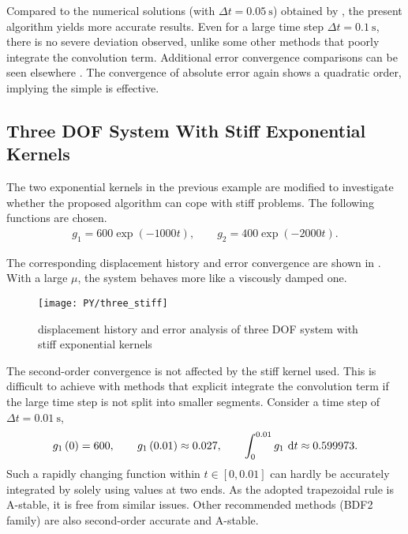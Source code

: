 Compared to the numerical solutions (with $\Delta{}t=\SI{0.05}{\second}$) obtained by \citet{Cortes2009}, the present algorithm yields more accurate results. Even for a large time step $\Delta{}t=\SI{0.1}{\second}$, there is no severe deviation observed, unlike some other methods \citep{Puthanpurayil2014,Liu2014} that poorly integrate the convolution term. Additional error convergence comparisons can be seen elsewhere \citep{Liu2023}. The convergence of absolute error again shows a quadratic order, implying the simple  is effective.
\subsection{Three DOF System With Stiff Exponential Kernels}
The two exponential kernels in the previous example are modified to investigate whether the proposed algorithm can cope with stiff problems. The following functions are chosen.
\begin{gather}
g_1=600\exp\left(-1000t\right),\qquad
g_2=400\exp\left(-2000t\right).
\end{gather}

The corresponding displacement history and error convergence are shown in . With a large $\mu$, the system behaves more like a viscously damped one.
\begin{figure}[H]
\centering
\texttt{[image: PY/three\_stiff]}
\caption{displacement history and error analysis of three DOF system with stiff exponential kernels}\label{fig:three_stiff}
\end{figure}
The second-order convergence is not affected by the stiff kernel used. This is difficult to achieve with methods that explicit integrate the convolution term if the large time step is not split into smaller segments. Consider a time step of $\Delta{}t=\SI{0.01}{\second}$,
\begin{gather}
g_1\left(0\right)=600,\qquad
g_1\left(0.01\right)\approx\num{0.027},\qquad\int_{0}^{0.01}g_1~\mathrm{d}t\approx0.599973.
\end{gather}
Such a rapidly changing function within $t\in[0,0.01]$ can hardly be accurately integrated by solely using values at two ends.
As the adopted trapezoidal rule is A-stable, it is free from similar issues. Other recommended methods (BDF2 family) are also second-order accurate and A-stable.
